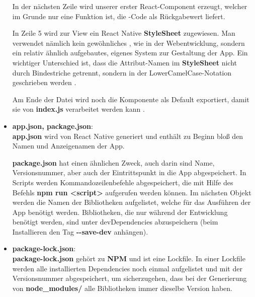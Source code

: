 \begin{itemize}
In der nächsten Zeile wird unserer erster React-Component erzeugt, welcher im Grunde nur eine
Funktion ist, die -Code als Rückgabewert liefert.

In Zeile 5 wird zur View ein React Native \textbf{StyleSheet} zugewiesen. Man verwendet nämlich kein
gewöhnliches , wie in der Webentwicklung, sondern ein relativ ähnlich aufgebautes,
eigenes System zur Gestaltung der App. Ein wichtiger Unterschied ist, dass die Attribut-Namen im
\textbf{StyleSheet} nicht durch Bindestriche getrennt, sondern in der LowerCamelCase-Notation geschrieben
werden \cite{camelCaseNotation}.

Am Ende der Datei wird noch die Komponente als Default exportiert, damit sie von \textbf{index.js} verarbeitet
werden kann \cite{jsModules}.

\item \textbf{app.json, package.json}:\\
\textbf{app.json} wird von React Native generiert und enthält zu Beginn bloß den Namen und Anzeigenamen der
App.


\textbf{package.json} hat einen ähnlichen Zweck, auch darin sind Name, Versionsnummer, aber auch der
Eintrittspunkt in die App abgespeichert. In Scripts werden Kommandozeilenbefehle abgespeichert, die
mit Hilfe des Befehls \textbf{npm run <script>} aufgerufen werden können. Im nächsten Objekt werden die
Namen der Bibliotheken aufgelistet, welche für das Ausführen der App benötigt werden. Bibliotheken,
die nur während der Entwicklung benötigt werden, sind unter devDependencies abzuspeichern (beim
Installieren den Tag \textbf{-{}-save-dev} anhängen).

\item \textbf{package-lock.json}:\\
\textbf{package-lock.json} gehört zu \textbf{NPM} und ist eine Lockfile. In einer Lockfile werden alle installierten
Dependencies noch einmal aufgelistet und mit der Versionsnummer abgespeichert, um sicherzugehen,
dass bei der Generierung von \textbf{node\_modules/} alle Bibliotheken immer dieselbe Version haben.

\newpage


\end{itemize}
